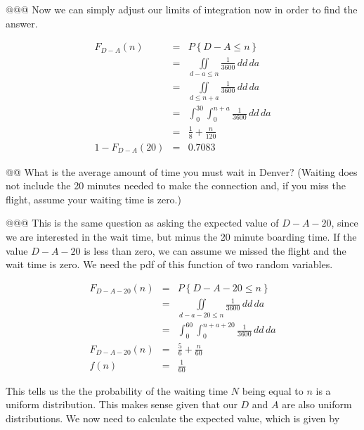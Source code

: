 \documentclass[11pt]{article}\usepackage[]{graphicx}\usepackage[]{xcolor}
\begin{document}
\begin{easylist}[enumerate]
    @@@ Now we can simply adjust our limits of integration now in order to find the answer.

    \begin{equation}
        \begin{aligned}
            F_{D-A}(n) &=& P\left\{ D - A \le n \right\}\\
                       &=& \iint\limits_{d - a \le n} \frac{1}{3600} \, dd \, da\\
                       &=& \iint\limits_{d \le n + a} \frac{1}{3600} \, dd \, da\\
                       &=& \int_0^{30} \int_0^{n+a} \frac{1}{3600} \, dd \, da\\
                       &=& \frac{1}{8} + \frac{n}{120}\\
       1 - F_{D-A}(20) &=& 0.7083
        \end{aligned}
    \end{equation}

    @@ What is the average amount of time you must wait in Denver? (Waiting does not include the 20 minutes needed to
    make the connection and, if you miss the flight, assume your waiting time is zero.)

    @@@ This is the same question as asking the expected value of $D - A - 20$, since we are interested in the wait
    time, but minus the 20 minute boarding time. If the value $D - A - 20$ is less than zero, we can assume we missed
    the flight and the wait time is zero. We need the pdf of this function of two random variables.

    \begin{equation}
        \begin{aligned}
            F_{D - A - 20}(n) &=& P\left\{ D - A - 20 \le n \right\}\\
                              &=& \iint\limits_{d - a - 20 \le n} \frac{1}{3600} \, dd \, da\\
                              &=& \int_0^{60} \int_0^{n + a + 20} \frac{1}{3600} \, dd\,da\\
            F_{D - A - 20}(n) &=& \frac{5}{6} + \frac{n}{60}\\
            f(n) &=& \frac{1}{60}
        \end{aligned}
    \end{equation}

    This tells us the the probability of the waiting time $N$ being equal to $n$ is a uniform distribution. This makes
    sense given that our $D$ and $A$ are also uniform distributions. We now need to calculate the expected value, which
    is given by


\end{easylist}
\end{document}
